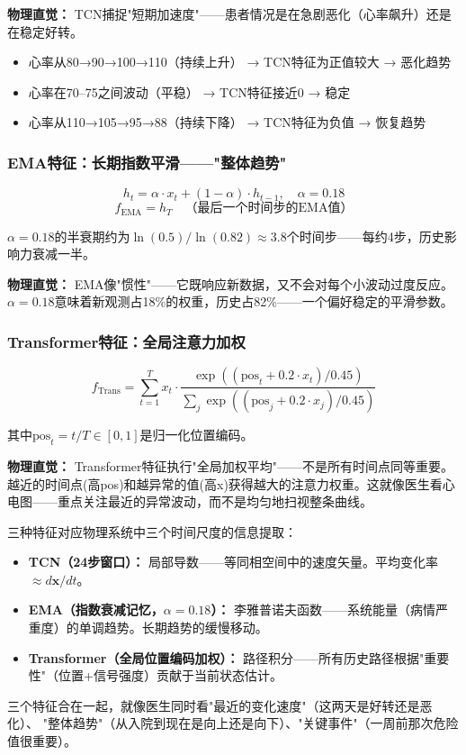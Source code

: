 \documentclass[11pt,a4paper]{ctexart}
\begin{document}
\textbf{物理直觉：} TCN捕捉"短期加速度"——患者情况是在急剧恶化（心率飙升）还是在稳定好转。

\begin{exambox}[TCN的两种信号]
\begin{itemize}[nosep]
\item 心率从80→90→100→110（持续上升） → TCN特征为正值较大 → 恶化趋势
\item 心率在70--75之间波动（平稳） → TCN特征接近0 → 稳定
\item 心率从110→105→95→88（持续下降） → TCN特征为负值 → 恢复趋势
\end{itemize}
\end{exambox}

\subsubsection{EMA特征：长期指数平滑——"整体趋势"}

$$h_t = \alpha \cdot x_t + (1-\alpha) \cdot h_{t-1}, \quad \alpha = 0.18$$
$$f_{\text{EMA}} = h_T \quad \text{（最后一个时间步的EMA值）}$$

$\alpha=0.18$的半衰期约为$\ln(0.5)/\ln(0.82) \approx 3.8$个时间步——每约4步，历史影响力衰减一半。

\textbf{物理直觉：} EMA像"惯性"——它既响应新数据，又不会对每个小波动过度反应。$\alpha=0.18$意味着新观测占18\%的权重，历史占82\%——一个偏好稳定的平滑参数。

\subsubsection{Transformer特征：全局注意力加权}

$$f_{\text{Trans}} = \sum_{t=1}^{T} x_t \cdot \frac{\exp((\text{pos}_t + 0.2 \cdot x_t)/0.45)}{\sum_j \exp((\text{pos}_j + 0.2 \cdot x_j)/0.45)}$$

其中$\text{pos}_t = t/T \in [0,1]$是归一化位置编码。

\textbf{物理直觉：} Transformer特征执行"全局加权平均"——不是所有时间点同等重要。越近的时间点(高pos)和越异常的值(高x)获得越大的注意力权重。这就像医生看心电图——重点关注最近的异常波动，而不是均匀地扫视整条曲线。

\begin{deepbox}
三种特征对应物理系统中三个时间尺度的信息提取：
\begin{itemize}[nosep]
\item \textbf{TCN（24步窗口）：} 局部导数——等同相空间中的速度矢量。平均变化率 $\approx d\mathbf{x}/dt$。
\item \textbf{EMA（指数衰减记忆，$\alpha=0.18$）：} 李雅普诺夫函数——系统能量（病情严重度）的单调趋势。长期趋势的缓慢移动。
\item \textbf{Transformer（全局位置编码加权）：} 路径积分——所有历史路径根据"重要性"（位置+信号强度）贡献于当前状态估计。
\end{itemize}
三个特征合在一起，就像医生同时看"最近的变化速度"（这两天是好转还是恶化）、
"整体趋势"（从入院到现在是向上还是向下）、"关键事件"（一周前那次危险值很重要）。
\end{deepbox}
\end{document}
